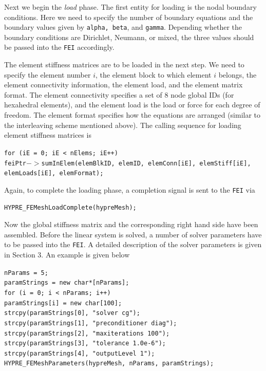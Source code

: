Next we begin the {\it load} phase. The first entity for loading is the
nodal boundary conditions. Here we need to specify the number of boundary
equations and the boundary values given by {\tt alpha, beta}, and {\tt gamma}.  Depending whether the boundary conditions are Dirichlet, Neumann, or mixed,
the three values should be passed into the {\tt FEI} accordingly. 

The element stiffness matrices are to be loaded in the next step. We need
to specify the element number $i$, the element block to which element $i$
belongs, the element connectivity information, the element load, and the
element matrix format. The element connectivity specifies a set of $8$ node
global IDs (for hexahedral elements), and the element load is the load or
force for each degree of freedom.  The element format specifies how the
equations are arranged (similar to the interleaving scheme mentioned above).
The calling sequence for loading element stiffness matrices is
\begin{tabbing}
\hspace{0.5in} \= {\tt for (iE = 0; iE < nElems; iE++)} \\
 \> \hspace{0.5in} {\tt feiPtr$->$sumInElem(elemBlkID, elemID, elemConn[iE], elemStiff[iE],} \\
 \> \hspace{1.5in} {\tt elemLoads[iE], elemFormat);}
\end{tabbing}
Again, to complete the loading phase, a completion signal is sent to 
the {\tt FEI} via
\begin{tabbing}
\hspace{0.5in} \= {\tt HYPRE\_FEMeshLoadComplete(hypreMesh);}
\end{tabbing}
 
Now the global stiffness matrix and the corresponding right hand side
have been assembled. Before the linear system is solved, a number of 
solver parameters have to be passed into the {\tt FEI}. A detailed description
of the solver parameters is given in Section 3. An example is given below
\begin{tabbing}
\hspace{0.5in} \= {\tt nParams = 5;} \\
               \> {\tt paramStrings = new char*[nParams];} \\
               \> {\tt for (i = 0; i < nParams; i++) }\\
               \> \hspace{0.5in} {\tt paramStrings[i] = new char[100];} \\
               \> {\tt strcpy(paramStrings[0], "solver cg");} \\
               \> {\tt strcpy(paramStrings[1], "preconditioner diag");} \\
               \> {\tt strcpy(paramStrings[2], "maxiterations 100");} \\
               \> {\tt strcpy(paramStrings[3], "tolerance 1.0e-6");} \\
               \> {\tt strcpy(paramStrings[4], "outputLevel 1");} \\
 \> {\tt HYPRE\_FEMeshParameters(hypreMesh, nParams, paramStrings);} 
\end{tabbing}

